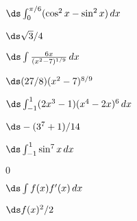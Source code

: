 \begin{exercises}
\begin{exercise} $\ds\int_0^{\pi/6}(\cos^2x - \sin^2x)\,dx$
\begin{answer} $\ds \sqrt3/4$
\end{answer}\end{exercise}

\begin{exercise} $\ds\int {6x\over(x^2 - 7)^{1/9}}\,dx$
\begin{answer} $\ds (27/8)(x^2-7)^{8/9}$
\end{answer}\end{exercise}

\begin{exercise} $\ds\int_{-1}^1 (2x^3-1)(x^4-2x)^6\,dx$
\begin{answer} $\ds -(3^7+1)/14$
\end{answer}\end{exercise}

\begin{exercise} $\ds\int_{-1}^1 \sin^7 x\,dx$
\begin{answer} $0$
\end{answer}\end{exercise}

\begin{exercise} $\ds\int f(x) f'(x)\,dx$ 
\begin{answer} $\ds f(x)^2/2$
\end{answer}\end{exercise}

\endtwocol

\end{exercises}
